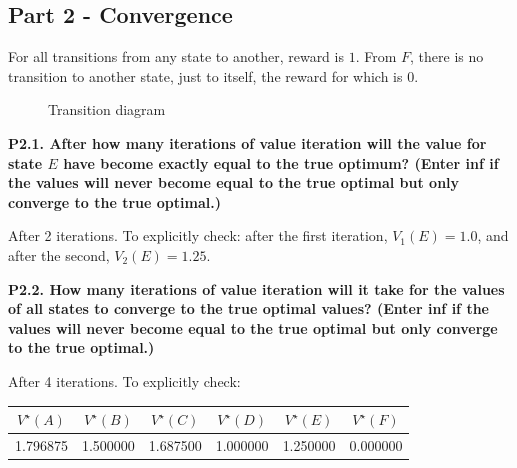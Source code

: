 \documentclass{homework}
\begin{document}
\clearpage
\subsection{Part 2 - Convergence}
For all transitions from any state to another, reward is $1$. From $F$, there is no transition to another state, just to itself, the reward for which is $0$.
\begin{figure}[h!]
    \centering
    
    \caption{Transition diagram}
    \label{fig:q12}
\end{figure}

\textbf{\large P2.1. After how many iterations of value iteration will the value for state $E$ have become exactly equal to the true optimum? (Enter inf if the values will never become equal to the true optimal but only converge to the true optimal.)}

After 2 iterations. To explicitly check: after the first iteration, $V_{1}(E) = 1.0$, and after the second, $V_{2}(E) = 1.25$.

\textbf{\large P2.2. How many iterations of value iteration will it take for the values of all states to converge to the true optimal values? (Enter inf if the values will never become equal to the true optimal but only converge to the true optimal.)}

After 4 iterations. To explicitly check:

\begin{table}[h!]
    \centering
    \begin{tabular}{c|c|c|c|c|c}
        \toprule
        $V^{\star}(A)$ & $V^{\star}(B)$ & $V^{\star}(C)$ & $V^{\star}(D)$ & $V^{\star}(E)$ & $V^{\star}(F)$ \\
        \midrule
        1.796875 & 1.500000 & 1.687500 & 1.000000 & 1.250000 & 0.000000 \\
        \bottomrule
    \end{tabular}
    \label{tab:q12vstr}
\end{table}
\end{document}
